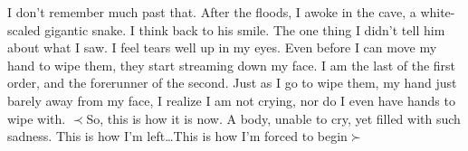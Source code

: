 \documentclass[openany, 12pt]{book}
\newcommand\tab[1][1cm]{\hspace*{#1}}
\begin{document}
\newline
\newline
\newline
\tab
I don't remember much past that. After the floods, I awoke in the cave, a white-scaled gigantic snake. I think back to his smile. The one thing I didn't tell him about what I saw. I feel tears well up in my eyes. Even before I can move my hand to wipe them, they start streaming down my face. I am the last of the first order, and the forerunner of the second.
\newline
\tab
Just as I go to wipe them, my hand just barely away from my face, I realize I am not crying, nor do I even have hands to wipe with.
\newline
$\prec$So, this is how it is now. A body, unable to cry, yet filled with such sadness. This is how I'm left\ldots This is how I'm forced to begin$\succ$
\end{document}
